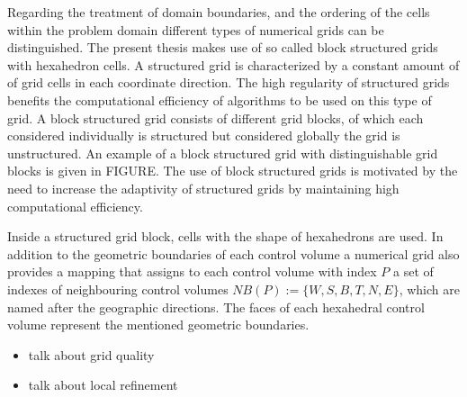     Regarding the treatment of domain boundaries, and the ordering of the cells within the problem domain different types of numerical grids can be distinguished. The present thesis makes use of so called block structured grids with hexahedron cells. A structured grid is characterized by a constant amount of of grid cells in each coordinate direction. The high regularity of structured grids benefits the computational efficiency of algorithms to be used on this type of grid. A block structured grid consists of different grid blocks, of which each considered individually is structured but considered globally the grid is unstructured. An example of a block structured grid with distinguishable grid blocks is given in FIGURE. The use of block structured grids is motivated by the need to increase the adaptivity of structured grids by maintaining high computational efficiency. 

    Inside a structured grid block, cells with the shape of hexahedrons are used. In addition to the geometric boundaries of each control volume a numerical grid also provides a mapping that assigns to each control volume with index \(P\) a set of indexes of neighbouring control volumes \(NB(P):=\{W,S,B,T,N,E\}\), which are named after the geographic directions. The faces of each hexahedral control volume represent the mentioned geometric boundaries. 

    \begin{itemize}
      \item talk about grid quality
      \item talk about local refinement
    \end{itemize}
    
